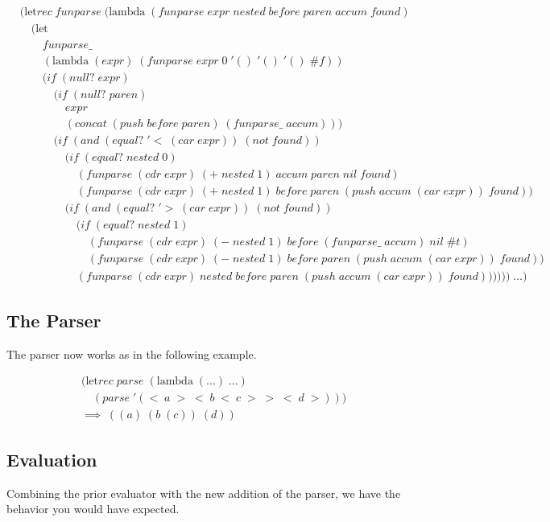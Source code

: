 \begin{align*}
& (\text{let}rec \; funparse \; (\text{lambda} \; (funparse \; expr \; nested \; before \; paren \; accum \; found) \; 
\\& \quad (\text{let} \; 
\\& \qquad funparse\_ \; 
\\& \qquad (\text{lambda} \; (expr) \; (funparse \; expr \; 0 \; '() \; '() \; '() \; \#f))
\\& \qquad (if \; (null? \; expr)
\\& \qquad \quad (if \; (null? \; paren) \; 
\\& \qquad \qquad expr
\\& \qquad \qquad (concat \; (push \; before \; paren) \; (funparse\_ \; accum)))
\\& \qquad \quad (if \; (and \; (equal? \; '< \; (car \; expr)) \; (not \; found))
\\& \qquad \qquad (if \; (equal? \; nested \; 0)
\\& \qquad \qquad \quad (funparse \; (cdr \; expr) \; (+ \; nested \; 1) \; accum \; paren \; nil \; found)
\\& \qquad \qquad \quad (funparse \; (cdr \; expr) \; (+ \; nested \; 1) \; before \; paren \; (push \; accum \; (car \; expr)) \; found))
\\& \qquad \qquad (if \; (and \; (equal? \; '> \; (car \; expr)) \; (not \; found))
\\& \qquad \qquad \quad (if \; (equal? \; nested \; 1)
\\& \qquad \qquad \qquad (funparse \; (cdr \; expr) \; (- \; nested \; 1) \; before \; (funparse\_ \; accum) \; nil \; \#t)
\\& \qquad \qquad \qquad (funparse \; (cdr \; expr) \; (- \; nested \; 1) \; before \; paren \; (push \; accum \; (car \; expr)) \; found))
\\& \qquad \qquad \quad (funparse \; (cdr \; expr) \; nested \; before \; paren \; (push \; accum \; (car \; expr)) \; found)))))) \; \dots)
\end{align*}

\subsection{The Parser}
The parser now works as in the following example.

\begin{align*}
& (\text{let}rec \; parse \; (\text{lambda} \; (\dots) \; \dots)
\\& \quad (parse \; '(< \; a \; > \; < \; b \; < \; c \; > \; > \; < \; d \; >)))
\\& \implies \; ((a) \; (b \; (c)) \; (d))
\end{align*}

\subsection{Evaluation}
Combining the prior evaluator with the new addition of the parser, we have the behavior you would have expected.

